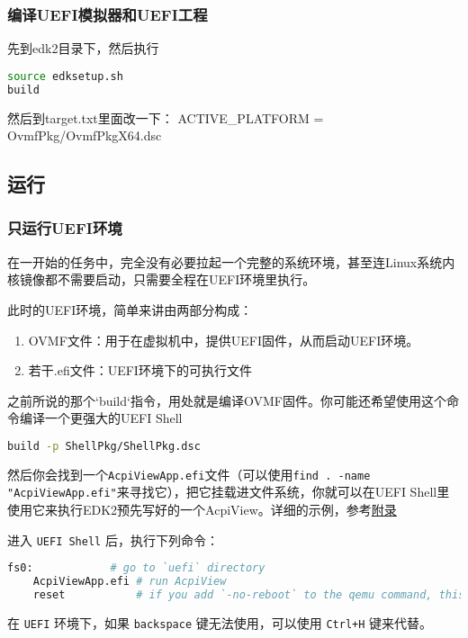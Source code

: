 \subsubsection{编译UEFI模拟器和UEFI工程}
先到edk2目录下，然后执行
\begin{lstlisting}[language=bash]
source edksetup.sh
build
\end{lstlisting}

然后到target.txt里面改一下：
ACTIVE\_PLATFORM       = OvmfPkg/OvmfPkgX64.dsc

\subsection{运行}

\label{run-edk2}

\subsubsection{只运行UEFI环境}
在一开始的任务中，完全没有必要拉起一个完整的系统环境，甚至连Linux系统内核镜像都不需要启动，只需要全程在UEFI环境里执行。

此时的UEFI环境，简单来讲由两部分构成：
\begin{enumerate}
	\item OVMF文件：用于在虚拟机中，提供UEFI固件，从而启动UEFI环境。
	\item 若干.efi文件：UEFI环境下的可执行文件
\end{enumerate}

之前所说的那个`build`指令，用处就是编译OVMF固件。你可能还希望使用这个命令编译一个更强大的UEFI Shell
\begin{lstlisting}[language=bash]
build -p ShellPkg/ShellPkg.dsc
\end{lstlisting}

然后你会找到一个\texttt{AcpiViewApp.efi}文件（可以使用\texttt{find . -name "AcpiViewApp.efi"}来寻找它），把它挂载进文件系统，你就可以在UEFI Shell里使用它来执行EDK2预先写好的一个AcpiView。详细的示例，参考\hyperref[appendix:launchuefi]{附录}

进入 \texttt{UEFI Shell} 后，执行下列命令：

\begin{lstlisting}[language=bash]
    fs0:            # go to `uefi` directory
    AcpiViewApp.efi # run AcpiView
    reset           # if you add `-no-reboot` to the qemu command, this will exit the UEFI Shell
\end{lstlisting}


\begin{remark}
    在 \texttt{UEFI} 环境下，如果 \texttt{backspace} 键无法使用，可以使用 \texttt{Ctrl+H} 键来代替。
\end{remark}

